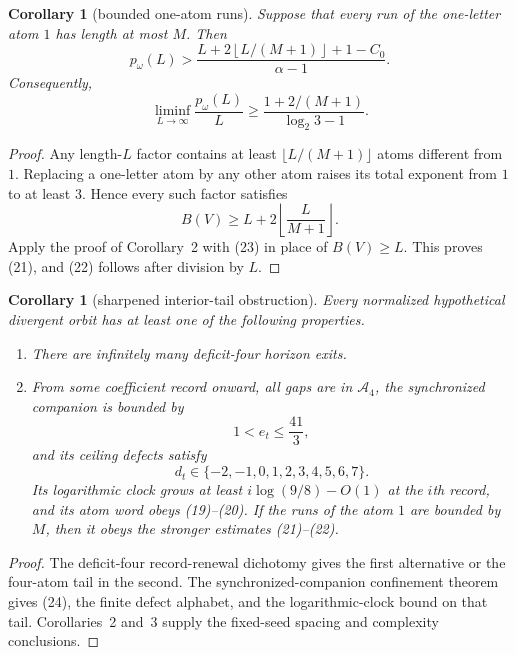 \documentclass[11pt]{article}
\newtheorem{corollary}[theorem]{Corollary}
\begin{document}
\begin{corollary}[bounded one-atom runs]
Suppose that every run of the one-letter atom $1$ has length at most
$M$.  Then
\[
\boxed{
 p_{\omega}(L)>
 \frac{
 L+2\left\lfloor L/(M+1)\right\rfloor+1-C_0
 }{\alpha-1}.}
\tag{21}
\]
Consequently,
\[
\boxed{
 \liminf_{L\to\infty}\frac{p_{\omega}(L)}L
 \geq
 \frac{1+2/(M+1)}{\log_2 3-1}.}
\tag{22}
\]
\end{corollary}

\begin{proof}
Any length-$L$ factor contains at least
$\lfloor L/(M+1)\rfloor$ atoms different from $1$.  Replacing a
one-letter atom by any other atom raises its total exponent from $1$ to at
least $3$.  Hence every such factor satisfies
\[
 B(V)\geq L+2\left\lfloor\frac{L}{M+1}\right\rfloor.
 \tag{23}
\]
Apply the proof of Corollary~2 with (23) in place of $B(V)\geq L$.
This proves (21), and (22) follows after division by $L$.
\end{proof}

\begin{corollary}[sharpened interior-tail obstruction]
Every normalized hypothetical divergent orbit has at least one of the
following properties.
\begin{enumerate}
 \item There are infinitely many deficit-four horizon exits.
 \item From some coefficient record onward, all gaps are in
 $\mathcal A_4$, the synchronized companion is bounded by
 \[
 1<e_t\leq\frac{41}{3},
 \tag{24}
 \]
 and its ceiling defects satisfy
 \[
 d_t\in\{-2,-1,0,1,2,3,4,5,6,7\}.
 \tag{25}
 \]
 Its logarithmic clock grows at least $i\log(9/8)-O(1)$ at the $i$th
 record, and its atom word obeys (19)--(20).  If the runs of the atom $1$
 are bounded by $M$, then it obeys the stronger estimates (21)--(22).
\end{enumerate}
\end{corollary}

\begin{proof}
The deficit-four record-renewal dichotomy gives the first alternative or
the four-atom tail in the second.  The synchronized-companion confinement
theorem gives (24), the finite defect alphabet, and the logarithmic-clock
bound on that tail.  Corollaries~2 and~3 supply the fixed-seed spacing and
complexity conclusions.
\end{proof}
\end{document}
